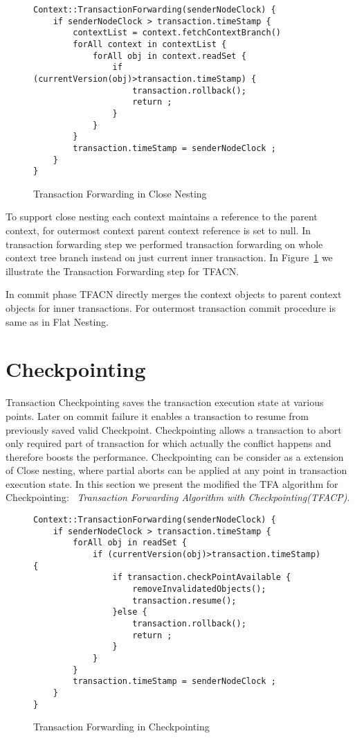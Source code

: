 \documentclass[12pt,english]{report}
\begin{document}
\begin{figure}[H]
\begin{minipage}[b]{0.9\linewidth}\centering
\begin{lstlisting}
Context::TransactionForwarding(senderNodeClock) {
	if senderNodeClock > transaction.timeStamp {
		contextList = context.fetchContextBranch()
		forAll context in contextList {
			forAll obj in context.readSet {
				if (currentVersion(obj)>transaction.timeStamp) { 
					transaction.rollback();
					return ;
				}		
			}
		}
		transaction.timeStamp = senderNodeClock ; 
	}
}
\end{lstlisting}
\end{minipage}
\caption{Transaction Forwarding in Close Nesting}
\label{Fig:CloseTFA}
\end{figure} 

To support close nesting each context maintains a reference to the parent context, for outermost context parent context reference is set to null. In transaction forwarding step we performed transaction forwarding on whole context tree branch instead on just current inner transaction. In Figure~\ref{Fig:CloseTFA} we illustrate the Transaction Forwarding step for TFACN.

In commit phase TFACN directly merges the context objects to parent context objects for inner transactions. For outermost transaction commit procedure is same as in Flat Nesting. 

\section{Checkpointing}

Transaction Checkpointing saves the transaction execution state at various points. Later on commit failure it enables a transaction to resume from previously saved valid Checkpoint. Checkpointing allows a transaction to abort only required part of transaction for which actually the conflict happens and therefore boosts the performance. Checkpointing can be consider as a extension of Close nesting, where partial aborts can be applied at any point in transaction execution state. In this section we present  the modified the TFA algorithm for Checkpointing: ~\emph{Transaction Forwarding Algorithm with Checkpointing(TFACP)}.

\begin{figure}[H]
\begin{minipage}[b]{0.9\linewidth}\centering
\begin{lstlisting}
Context::TransactionForwarding(senderNodeClock) {
	if senderNodeClock > transaction.timeStamp {
		forAll obj in readSet {
			if (currentVersion(obj)>transaction.timeStamp) { 
				if transaction.checkPointAvailable {
					removeInvalidatedObjects();
					transaction.resume();
				}else {
					transaction.rollback();
					return ;
				}		
			}
		}
		transaction.timeStamp = senderNodeClock ; 
	}
}
\end{lstlisting}
\end{minipage}
\caption{Transaction Forwarding in Checkpointing}
\label{Fig:CheckPointTFA}
\end{figure} 
\end{document}

